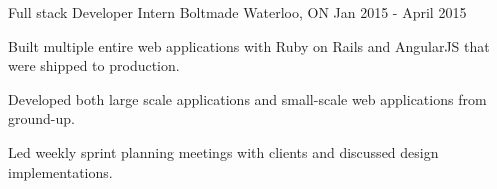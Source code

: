 \begin{cventries}
  \cventry
    {Full stack Developer Intern} %
    {Boltmade} %
    {Waterloo, ON} %
    {Jan 2015 - April 2015} %
    {
      \begin{cvitems} %
      \item {Built multiple entire web applications with Ruby on Rails and AngularJS that were shipped to production.}
      \item {Developed both large scale applications and small-scale web applications from ground-up.}
      \item {Led weekly sprint planning meetings with clients and discussed design implementations.}
  \end{cvitems} 
    }

\end{cventries}
